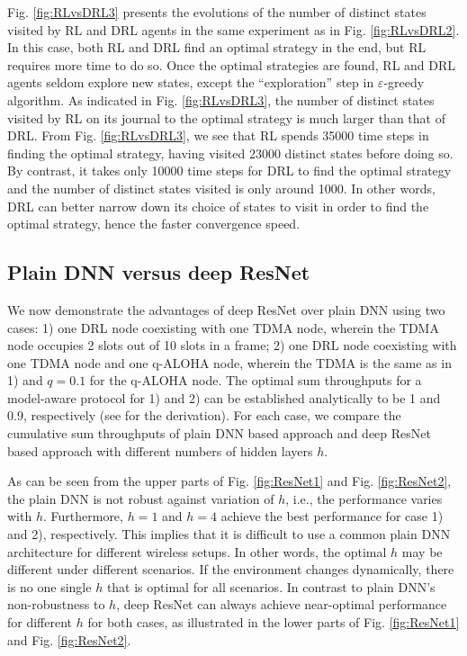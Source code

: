 \documentclass[journal,comsoc]{IEEEtran}
\begin{document}
Fig. \ref{fig:RLvsDRL3} presents the evolutions of the number of distinct states visited by RL and DRL agents in the same experiment as in Fig. \ref{fig:RLvsDRL2}. In this case, both RL and DRL find an optimal strategy in the end, but RL requires more time to do so. Once the optimal strategies are found, RL and DRL agents seldom explore new states, except the ``exploration'' step in $ \varepsilon $-greedy algorithm. As indicated in Fig. \ref{fig:RLvsDRL3}, the number of distinct states visited by RL on its journal to the optimal strategy is much larger than that of DRL. From Fig. \ref{fig:RLvsDRL3}, we  see that RL spends 35000 time steps in finding the optimal strategy, having visited 23000 distinct states before doing so. By contrast, it takes only 10000 time steps for DRL to find the optimal strategy and the number of distinct states visited is only around 1000. In other words, DRL can better narrow down its choice of states to visit in order to find the optimal strategy, hence the faster convergence speed. 

\subsection{Plain DNN versus deep ResNet}\label{sec:ResNet}
We now demonstrate the advantages of deep ResNet over plain DNN using two cases: 1) one DRL node coexisting with one TDMA node, wherein the TDMA node occupies 2 slots out of 10 slots in a frame; 2) one DRL node coexisting with one TDMA node and one q-ALOHA node, wherein the TDMA is the same as in 1) and  $ q=0.1 $ for the q-ALOHA node. The optimal sum throughputs for a model-aware protocol  for 1) and 2) can be established analytically to be  1 and 0.9, respectively (see \cite{benchmark} for the derivation). For each case, we compare the cumulative sum throughputs of plain DNN based approach and deep ResNet based approach with different numbers of hidden layers $ h $. 

As can be seen from the upper parts of Fig. \ref{fig:ResNet1} and Fig. \ref{fig:ResNet2}, the plain DNN is not robust against variation of   $ h $, i.e., the performance varies with   $ h $. Furthermore, $ h=1 $ and  $ h=4 $  achieve the best performance for case 1) and 2), respectively. This implies that it is difficult to use a common plain DNN architecture for different wireless setups.  In other words, the optimal $ h $ may be different under different scenarios. If the environment changes dynamically, there is no one single $ h $ that is optimal for all scenarios. In contrast to plain DNN's non-robustness to $ h $, deep ResNet can always achieve near-optimal performance for different $ h $  for both cases, as illustrated in the lower parts of Fig. \ref{fig:ResNet1} and Fig. \ref{fig:ResNet2}. 
\end{document}
